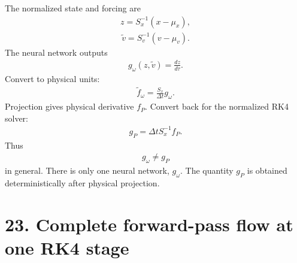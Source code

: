 \documentclass[11pt]{article}
\begin{document}
The normalized state and forcing are
\begin{align}
\boxed{z=S_x^{-1}(x-\mu_x),}
\tag{E5.76}
\end{align}
\begin{align}
\boxed{\widetilde v=S_v^{-1}(v-\mu_v).}
\tag{E5.77}
\end{align}
The neural network outputs
\begin{align}
\boxed{g_\omega(z,\widetilde v)=\frac{dz}{d\tau}.}
\tag{E5.78}
\end{align}
Convert to physical units:
\begin{align}
\boxed{\widetilde f_\omega=\frac{S_x}{\Delta t}g_\omega.}
\tag{E5.79}
\end{align}
Projection gives physical derivative \(f_P\). Convert back for the normalized RK4 solver:
\begin{align}
\boxed{g_P=\Delta tS_x^{-1}f_P.}
\tag{E5.80}
\end{align}
Thus
\begin{align}
\boxed{g_\omega\neq g_P}
\tag{E5.81}
\end{align}
in general. There is only one neural network, \(g_\omega\). The quantity \(g_P\) is obtained deterministically after physical projection.

\section*{23. Complete forward-pass flow at one RK4 stage}
\end{document}
